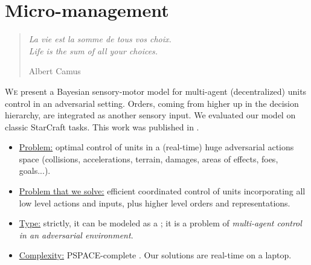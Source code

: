 \chapter{Micro-management}
\begin{quotation}
\noindent
\textit{La vie est la somme de tous vos choix.
\vspace{0.2cm}\\
Life is the sum of all your choices.}
\begin{flushright}Albert Camus\end{flushright}
\end{quotation}

\lettrine{W}{e} present a Bayesian sensory-motor model for multi-agent (decentralized) units control in an adversarial setting. Orders, coming from higher up in the decision hierarchy, are integrated as another sensory input. We evaluated our model on classic StarCraft  tasks. This work was published in \citep{SYNNAEVE:Micro}.

\chaptertoc

\begin{itemize}
\item \underline{Problem:} optimal control of units in a (real-time) huge adversarial actions space (collisions, accelerations, terrain, damages, areas of effects, foes, goals...).
\item \underline{Problem that we solve:} efficient coordinated control of units incorporating all low level actions and inputs, plus higher level orders and representations.
\item \underline{Type:} strictly, it can be modeled as a ; it is a problem of \textit{multi-agent control in an adversarial environment}.
\item \underline{Complexity:} PSPACE-complete \citep{Papadimitriou87,GamingComplexity}. Our solutions are real-time on a laptop.
\end{itemize}



